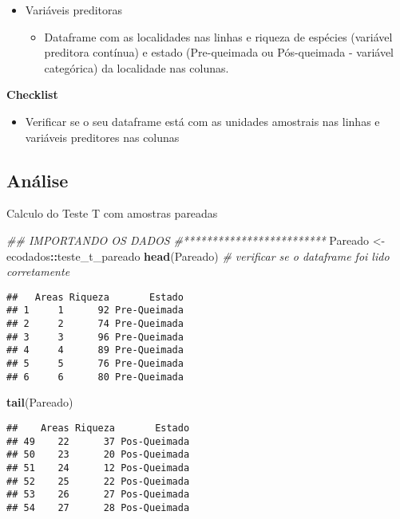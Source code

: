 \documentclass[
]{book}
\newenvironment{Shaded}{\begin{snugshade}}{\end{snugshade}}
\newcommand{\CommentTok}[1]{\textcolor[rgb]{0.56,0.35,0.01}{\textit{#1}}}
\newcommand{\KeywordTok}[1]{\textcolor[rgb]{0.13,0.29,0.53}{\textbf{#1}}}
\newcommand{\NormalTok}[1]{#1}
\newcommand{\OperatorTok}[1]{\textcolor[rgb]{0.81,0.36,0.00}{\textbf{#1}}}
\newcommand{\StringTok}[1]{\textcolor[rgb]{0.31,0.60,0.02}{#1}}
\providecommand{\tightlist}{%
  \setlength{\itemsep}{0pt}\setlength{\parskip}{0pt}}
\begin{document}
\begin{itemize}
\tightlist
\item
  Variáveis preditoras

  \begin{itemize}
  \tightlist
  \item
    Dataframe com as localidades nas linhas e riqueza de espécies (variável preditora contínua) e estado (Pre-queimada ou Pós-queimada - variável categórica) da localidade nas colunas.
  \end{itemize}
\end{itemize}

\textbf{Checklist}

\begin{itemize}
\tightlist
\item
  Verificar se o seu dataframe está com as unidades amostrais nas linhas e variáveis preditores nas colunas
\end{itemize}

\hypertarget{anuxe1lise-2}{%
\subsection{Análise}\label{anuxe1lise-2}}

Calculo do Teste T com amostras pareadas

\begin{Shaded}
\begin{Highlighting}[]
\CommentTok{## IMPORTANDO OS DADOS}
\CommentTok{#*************************}
\NormalTok{Pareado <-}\StringTok{ }\NormalTok{ecodados}\OperatorTok{::}\NormalTok{teste_t_pareado}
\KeywordTok{head}\NormalTok{(Pareado) }\CommentTok{# verificar se o dataframe foi lido corretamente}
\end{Highlighting}
\end{Shaded}

\begin{verbatim}
##   Areas Riqueza       Estado
## 1     1      92 Pre-Queimada
## 2     2      74 Pre-Queimada
## 3     3      96 Pre-Queimada
## 4     4      89 Pre-Queimada
## 5     5      76 Pre-Queimada
## 6     6      80 Pre-Queimada
\end{verbatim}

\begin{Shaded}
\begin{Highlighting}[]
\KeywordTok{tail}\NormalTok{(Pareado)}
\end{Highlighting}
\end{Shaded}

\begin{verbatim}
##    Areas Riqueza       Estado
## 49    22      37 Pos-Queimada
## 50    23      20 Pos-Queimada
## 51    24      12 Pos-Queimada
## 52    25      22 Pos-Queimada
## 53    26      27 Pos-Queimada
## 54    27      28 Pos-Queimada
\end{verbatim}
\end{document}
